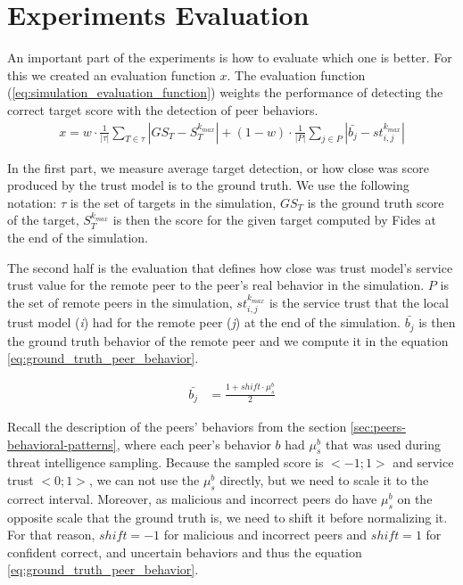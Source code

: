 \section{Experiments Evaluation}
\label{sec:experiments-evaluation}

An important part of the experiments is how to evaluate which one is better. For this we created an evaluation function $x$.
The evaluation function (\ref{eq:simulation_evaluation_function}) weights the performance of detecting the correct target score with the detection of peer behaviors.
\begin{equation}
\begin{split}
    x = w \cdot \frac{1}{|\tau|} \sum_{T \in \tau}\left|GS_{T} - S^{k_{max}}_{T} \right| + \left(1 - w\right) \cdot \frac{1}{|P|} \sum_{j \in P}\left|\bar{b_{j}} - st^{k_{max}}_{i, j} \right|
\end{split}
\label{eq:simulation_evaluation_function}
\end{equation}

In the first part, we measure average target detection, or how close was score produced by the trust model is to the ground truth.
We use the following notation: $\tau$ is the set of targets in the simulation, $GS_{T}$ is the ground truth score of the target, $S^{k_{max}}_{T}$ is then the score for the given target computed by Fides at the end of the simulation.

The second half is the evaluation that defines how close was trust model's service trust value for the remote peer to the peer's real behavior in the simulation.
$P$ is the set of remote peers in the simulation, $st^{k_{max}}_{i, j}$ is the service trust that the local trust model (\textit{i}) had for the remote peer (\textit{j}) at the end of the simulation.
$\bar{b_{j}}$ is then the ground truth behavior of the remote peer and we compute it in the equation \ref{eq:ground_truth_peer_behavior}.

\begin{equation}
    \begin{split}
    \bar{b_{j}} &= \frac{1 + shift \cdot \mu^{b}_{s}}{2}
    \end{split}
    \label{eq:ground_truth_peer_behavior}
\end{equation}

Recall the description of the peers' behaviors from the section \ref{sec:peers-behavioral-patterns}, where each peer's behavior $b$ had $\mu^{b}_{s}$ that was used during threat intelligence sampling.
Because the sampled score is $<-1; 1>$ and service trust $<0; 1>$, we can not use the $\mu^{b}_{s}$ directly, but we need to scale it to the correct interval.
Moreover, as malicious and incorrect peers  do have $\mu^{b}_{s}$ on the opposite scale that the ground truth is, we need to shift it before normalizing it.
For that reason, $shift = -1$ for malicious and incorrect peers and $shift = 1$ for confident correct, and uncertain behaviors and thus the equation \ref{eq:ground_truth_peer_behavior}.

